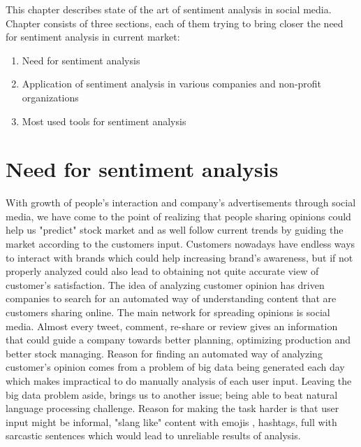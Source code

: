 This chapter describes state of the art of sentiment analysis in social media.
Chapter consists of three sections, each of them trying to bring closer the need for sentiment analysis in current market:

\begin{enumerate}
	\item Need for sentiment analysis
	\item Application of sentiment analysis in various companies and non-profit organizations
	\item Most used tools for sentiment analysis
\end{enumerate}

\section{Need for sentiment analysis}
With growth of people's interaction and company's advertisements through social media, we have come to the point of realizing that people sharing opinions could help us "predict" stock market and as well follow current trends by guiding the market according to the customers input.
Customers nowadays have endless ways to interact with brands which could help increasing brand's awareness, but if not properly analyzed could also lead to obtaining not quite accurate view of customer's satisfaction.
The idea of analyzing customer opinion has driven companies to search for an automated way of understanding content that are customers sharing online. The main network for spreading opinions is social media. Almost every tweet, comment, re-share or  review gives an information that could guide a company towards better planning, optimizing production and better stock managing.
Reason for finding an automated way of analyzing customer's opinion comes from a problem of big data being generated each day which makes impractical to do manually analysis of each user input. Leaving the big data problem aside, brings us to another issue; being able to beat natural language processing challenge. Reason for making the task harder is that user input might be informal, "slang like" content with emojis , hashtags, full with sarcastic sentences which would lead to unreliable results of analysis.

